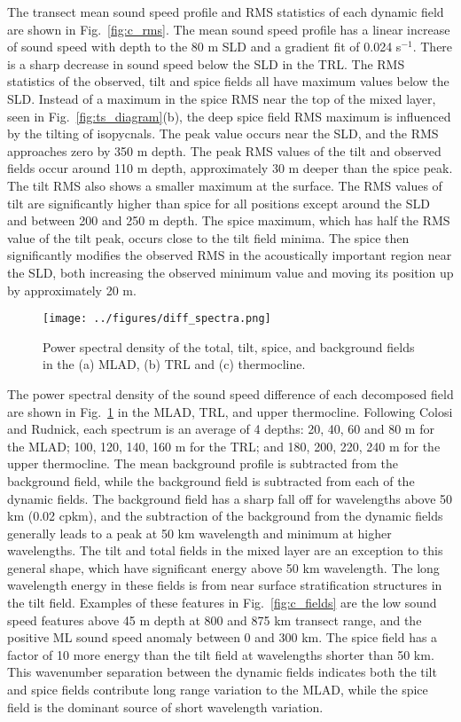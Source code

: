 \documentclass[preprint,NumberedRefs]{JASA}
\begin{document}
The transect mean sound speed profile and RMS statistics of each dynamic field are shown in Fig.~\ref{fig:c_rms}. The mean sound speed profile has a linear increase of sound speed with depth to the 80 m SLD and a gradient fit of 0.024 s$^{-1}$. There is a sharp decrease in sound speed below the SLD in the TRL. The RMS statistics of the observed, tilt and spice fields all have maximum values below the SLD. Instead of a maximum in the spice RMS near the top of the mixed layer, seen in Fig.~\ref{fig:ts_diagram}(b), the deep spice field RMS maximum is influenced by the tilting of isopycnals\citep{ferrari2000}. The peak value occurs near the SLD, and the RMS approaches zero by 350 m depth. The peak RMS values of the tilt and observed fields occur around 110 m depth, approximately 30 m deeper than the spice peak. The tilt RMS also shows a smaller maximum at the surface. The RMS values of tilt are significantly higher than spice for all positions except around the SLD and between 200 and 250 m depth. The spice maximum, which has half the RMS value of the tilt peak, occurs close to the tilt field minima. The spice then significantly modifies the observed RMS in the acoustically important region near the SLD, both increasing the observed minimum value and moving its position up by approximately 20 m.

\begin{figure}
\texttt{[image: ../figures/diff\_spectra.png]}
        \caption{\label{fig:spectra}{Power spectral density of the total, tilt, spice, and background fields in the (a) MLAD, (b) TRL and (c) thermocline.}}
\end{figure}
The power spectral density of the sound speed difference of each decomposed field are shown in Fig.~\ref{fig:spectra} in the MLAD, TRL, and upper thermocline. Following Colosi and Rudnick\cite{colosi2020observations}, each spectrum is an average of 4 depths: 20, 40, 60 and 80 m for the MLAD; 100, 120, 140, 160 m for the TRL; and 180, 200, 220, 240 m for the upper thermocline. The mean background profile is subtracted from the background field, while the background field is subtracted from each of the dynamic fields. The background field has a sharp fall off for wavelengths above 50 km (0.02 cpkm), and the subtraction of the background from the dynamic fields generally leads to a peak at 50 km wavelength and minimum at higher wavelengths. The tilt and total fields in the mixed layer are an exception to this general shape, which have significant energy above 50 km wavelength. The long wavelength energy in these fields is from near surface stratification structures in the tilt field. Examples of these features in Fig.~\ref{fig:c_fields} are the low sound speed features above 45 m depth at 800 and 875 km transect range, and the positive ML sound speed anomaly between 0 and 300 km. The spice field has a factor of 10 more energy than the tilt field at wavelengths shorter than 50 km. This wavenumber separation between the dynamic fields indicates both the tilt and spice fields contribute long range variation to the MLAD, while the spice field is the dominant source of short wavelength variation.
\end{document}
